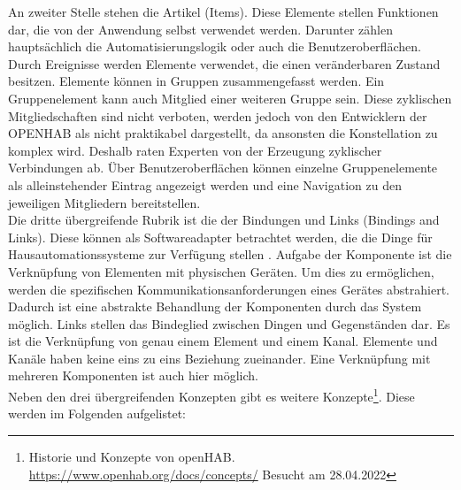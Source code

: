     An zweiter Stelle stehen die Artikel (Items). Diese Elemente stellen Funktionen dar, die von der Anwendung selbst verwendet 
    werden. Darunter zählen hauptsächlich die Automatisierungslogik oder auch die Benutzeroberflächen. Durch Ereignisse werden 
    Elemente verwendet, die einen veränderbaren Zustand besitzen. %
    Elemente können in Gruppen zusammengefasst werden. Ein Gruppenelement kann auch Mitglied einer weiteren Gruppe sein. 
    Diese zyklischen Mitgliedschaften sind nicht verboten, werden jedoch von den Entwicklern der \acs{OPENHAB} als nicht 
    praktikabel dargestellt, da ansonsten die Konstellation zu komplex wird. Deshalb raten Experten von der Erzeugung 
    zyklischer Verbindungen ab. Über Benutzeroberflächen können 
    einzelne Gruppenelemente als alleinstehender Eintrag angezeigt werden und eine Navigation zu den jeweiligen Mitgliedern 
    bereitstellen. 
    \\
    \linebreak
    Die dritte übergreifende Rubrik ist die der Bindungen und Links (Bindings and Links). Diese können als Softwareadapter betrachtet werden, die 
    die Dinge für Hausautomationssysteme zur Verfügung stellen \cite{openHAB-article}. Aufgabe der Komponente ist die Verknüpfung 
    von Elementen mit physischen Geräten. Um dies zu ermöglichen, werden die spezifischen Kommunikationsanforderungen eines Gerätes 
    abstrahiert. Dadurch ist eine abstrakte Behandlung der Komponenten durch das System möglich. Links stellen das Bindeglied 
    zwischen Dingen und Gegenständen dar. Es ist die Verknüpfung von genau einem Element und einem Kanal. Elemente und 
    Kanäle haben keine eins zu eins Beziehung zueinander. Eine Verknüpfung mit mehreren Komponenten ist auch hier möglich. 
    \\
    Neben den drei übergreifenden Konzepten gibt es weitere Konzepte\footnote{Historie und Konzepte von openHAB. \url{https://www.openhab.org/docs/concepts/} Besucht am 28.04.2022}. %
    Diese werden im Folgenden aufgelistet:
